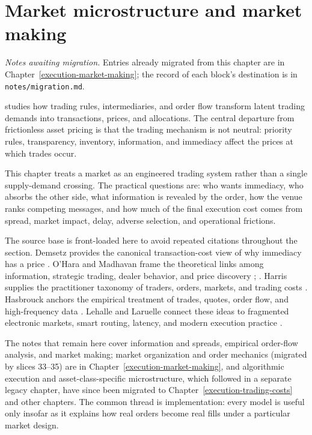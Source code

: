 \chapter{Market microstructure and market making}\label{legacy:execution-market-making}

\noindent\emph{Notes awaiting migration.} Entries already migrated from this chapter are in Chapter~\ref{execution-market-making}; the record of each block's destination is in \texttt{notes/migration.md}.

 studies how trading rules, intermediaries, and order flow transform latent trading demands into transactions, prices, and allocations. The central departure from frictionless asset pricing is that the trading mechanism is not neutral: priority rules, transparency, inventory, information, and immediacy affect the prices at which trades occur.

This chapter treats a market as an engineered trading system rather than a single supply-demand crossing. The practical questions are: who wants immediacy, who absorbs the other side, what information is revealed by the order, how the venue ranks competing messages, and how much of the final execution cost comes from spread, market impact, delay, adverse selection, and operational frictions.

The source base is front-loaded here to avoid repeated citations throughout the section. Demsetz provides the canonical transaction-cost view of why immediacy has a price \citep{demsetz-1968}. O'Hara and Madhavan frame the theoretical links among information, strategic trading, dealer behavior, and price discovery \citep{catalogue-0496}; \citep{madhavan-2000}. Harris supplies the practitioner taxonomy of traders, orders, markets, and trading costs \citep{alpha-harris}. Hasbrouck anchors the empirical treatment of trades, quotes, order flow, and high-frequency data \citep{s6-hasbrouck}. Lehalle and Laruelle connect these ideas to fragmented electronic markets, smart routing, latency, and modern execution practice \citep{alpha-laruelle}.

The notes that remain here cover information and spreads, empirical order-flow analysis, and market making; market organization and order mechanics (migrated by slices 33--35) are in Chapter~\ref{execution-market-making}, and algorithmic execution and asset-class-specific microstructure, which followed in a separate legacy chapter, have since been migrated to Chapter~\ref{execution-trading-costs} and other chapters. The common thread is implementation: every model is useful only insofar as it explains how real orders become real fills under a particular market design.



\newpage


\newpage

